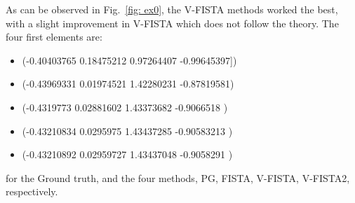 %
As can be observed in Fig.~\ref{fig: ex0}, the V-FISTA 
methods worked the best, with a slight improvement in 
V-FISTA which does not follow the theory.
The four first elements are:
\begin{itemize}
    \item (-0.40403765  0.18475212  0.97264407 -0.99645397])
    \item (-0.43969331  0.01974521  1.42280231 -0.87819581)
    \item (-0.4319773   0.02881602  1.43373682 -0.9066518 )
    \item (-0.43210834  0.0295975   1.43437285 -0.90583213 )
    \item (-0.43210892  0.02959727  1.43437048 -0.9058291 )
\end{itemize}
%
for the Ground truth, and the four methods, PG, FISTA,
V-FISTA, V-FISTA2, respectively.